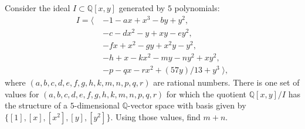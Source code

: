 Consider the ideal $I \subset \mathbb{Q}[x,y]$ generated by $5$ polynomials:
\begin{align*}
I = \bigl\langle\;
& -1 - ax + x^3 - by + y^2,\\
& -c - dx^2 - y + xy - ey^2,\\
& -fx + x^2 - gy + x^2 y - y^2,\\
& -h + x - kx^2 - my - ny^2 + xy^2,\\
& -p - qx - rx^2 + (57y)/13 + y^3
\;\bigr\rangle,
\end{align*}
where $(a, b, c, d, e, f, g, h, k, m, n, p, q, r)$ are rational numbers. There is one set of values for $(a, b, c, d, e, f, g, h, k, m, n, p, q, r)$ for which the quotient $\mathbb{Q}[x,y]/I$ has the structure of a $5$-dimensional $\mathbb{Q}$-vector space with basis given by $\{[1],[x],[x^2],[y],[y^2]\}$. Using those values, find $m+n$.

